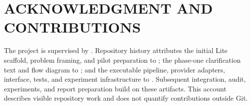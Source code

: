 \section*{ACKNOWLEDGMENT AND CONTRIBUTIONS}
The project is supervised by . Repository history attributes the initial Lite scaffold, problem framing, and pilot preparation to ; the phase-one clarification text and flow diagram to ; and the executable pipeline, provider adapters, interface, tests, and experiment infrastructure to . Subsequent integration, audit, experiments, and report preparation build on these artifacts. This account describes visible repository work and does not quantify contributions outside Git.
